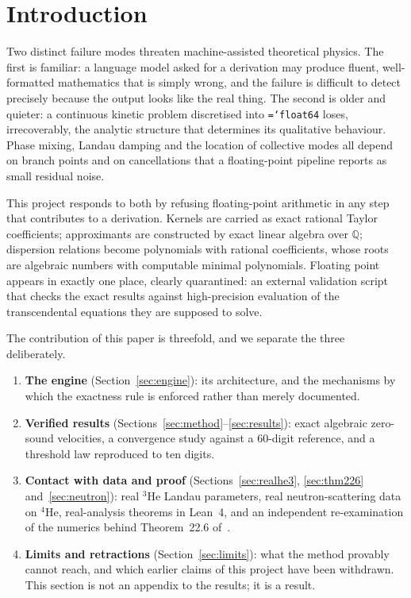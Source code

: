 \documentclass[11pt,a4paper]{article}
\newcommand{\code}[1]{\texttt{\hyphenchar\font=`\-\relax #1}}
\begin{document}
\tableofcontents

\section{Introduction}
\label{sec:intro}

Two distinct failure modes threaten machine-assisted theoretical physics. The
first is familiar: a language model asked for a derivation may produce fluent,
well-formatted mathematics that is simply wrong, and the failure is difficult to
detect precisely because the output looks like the real thing. The second is
older and quieter: a continuous kinetic problem discretised into
\code{float64} loses, irrecoverably, the analytic structure that determines its
qualitative behaviour. Phase mixing, Landau damping and the location of
collective modes all depend on branch points and on cancellations that a
floating-point pipeline reports as small residual noise.

This project responds to both by refusing floating-point arithmetic in any step
that contributes to a derivation. Kernels are carried as exact rational Taylor
coefficients; approximants are constructed by exact linear algebra over
$\mathbb{Q}$; dispersion relations become polynomials with rational
coefficients, whose roots are algebraic numbers with computable minimal
polynomials. Floating point appears in exactly one place, clearly quarantined:
an external validation script that checks the exact results against
high-precision evaluation of the transcendental equations they are supposed to
solve.

The contribution of this paper is threefold, and we separate the three
deliberately.

\begin{enumerate}
  \item \textbf{The engine} (Section~\ref{sec:engine}): its architecture, and
        the mechanisms by which the exactness rule is enforced rather than
        merely documented.
  \item \textbf{Verified results} (Sections~\ref{sec:method}--\ref{sec:results}):
        exact algebraic zero-sound velocities, a convergence study against a
        $60$-digit reference, and a threshold law reproduced to ten digits.
  \item \textbf{Contact with data and proof}
        (Sections~\ref{sec:realhe3}, \ref{sec:thm226} and~\ref{sec:neutron}):
        real $^3$He Landau parameters, real neutron-scattering data on $^4$He,
        real-analysis theorems in Lean~4, and an independent re-examination of
        the numerics behind Theorem~22.6 of~\cite{villani2025}.
  \item \textbf{Limits and retractions} (Section~\ref{sec:limits}): what the
        method provably cannot reach, and which earlier claims of this project
        have been withdrawn. This section is not an appendix to the results; it
        is a result.
\end{enumerate}
\end{document}
